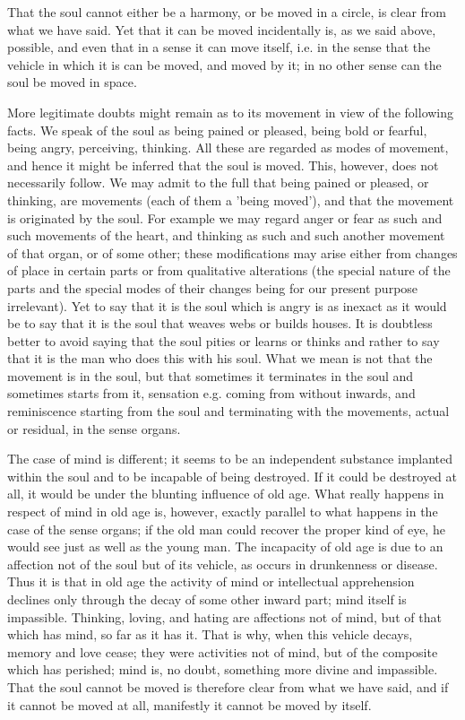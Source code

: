 That the soul cannot either be a harmony, or be moved in a circle,
is clear from what we have said. Yet that it can be moved incidentally
is, as we said above, possible, and even that in a sense it can move
itself, i.e. in the sense that the vehicle in which it is can be moved,
and moved by it; in no other sense can the soul be moved in space.

More legitimate doubts might remain as to its movement in view of
the following facts. We speak of the soul as being pained or pleased,
being bold or fearful, being angry, perceiving, thinking. All these
are regarded as modes of movement, and hence it might be inferred
that the soul is moved. This, however, does not necessarily follow.
We may admit to the full that being pained or pleased, or thinking,
are movements (each of them a 'being moved'), and that the movement
is originated by the soul. For example we may regard anger or fear
as such and such movements of the heart, and thinking as such and
such another movement of that organ, or of some other; these modifications
may arise either from changes of place in certain parts or from qualitative
alterations (the special nature of the parts and the special modes
of their changes being for our present purpose irrelevant). Yet to
say that it is the soul which is angry is as inexact as it would be
to say that it is the soul that weaves webs or builds houses. It is
doubtless better to avoid saying that the soul pities or learns or
thinks and rather to say that it is the man who does this with his
soul. What we mean is not that the movement is in the soul, but that
sometimes it terminates in the soul and sometimes starts from it,
sensation e.g. coming from without inwards, and reminiscence starting
from the soul and terminating with the movements, actual or residual,
in the sense organs. 

The case of mind is different; it seems to be an independent substance
implanted within the soul and to be incapable of being destroyed.
If it could be destroyed at all, it would be under the blunting influence
of old age. What really happens in respect of mind in old age is,
however, exactly parallel to what happens in the case of the sense
organs; if the old man could recover the proper kind of eye, he would
see just as well as the young man. The incapacity of old age is due
to an affection not of the soul but of its vehicle, as occurs in drunkenness
or disease. Thus it is that in old age the activity of mind or intellectual
apprehension declines only through the decay of some other inward
part; mind itself is impassible. Thinking, loving, and hating are
affections not of mind, but of that which has mind, so far as it has
it. That is why, when this vehicle decays, memory and love cease;
they were activities not of mind, but of the composite which has perished;
mind is, no doubt, something more divine and impassible. That the
soul cannot be moved is therefore clear from what we have said, and
if it cannot be moved at all, manifestly it cannot be moved by itself.

